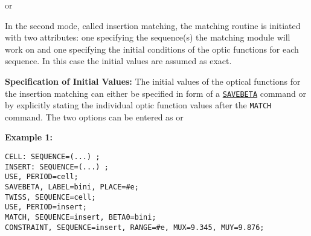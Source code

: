 
or


In the second mode, called insertion matching, the matching routine is
initiated with two attributes: one specifying the sequence(s) the
matching module will work on and one specifying the initial conditions
of the optic functions for each sequence. In this case the initial
values are assumed as exact. 
    
\textbf{Specification of Initial Values:}
The initial values of the optical
functions  for the insertion matching can either be specified in form of
a \hyperref[sec:savebeta]{\texttt{SAVEBETA}} command or by
explicitly stating the individual optic function values after the
\texttt{MATCH} command. The two options can be entered as         
or

\textbf{Example 1:}   
\begin{verbatim}
CELL: SEQUENCE=(...) ;
INSERT: SEQUENCE=(...) ;
USE, PERIOD=cell;
SAVEBETA, LABEL=bini, PLACE=#e;
TWISS, SEQUENCE=cell;
USE, PERIOD=insert;
MATCH, SEQUENCE=insert, BETA0=bini;
CONSTRAINT, SEQUENCE=insert, RANGE=#e, MUX=9.345, MUY=9.876;
\end{verbatim}

